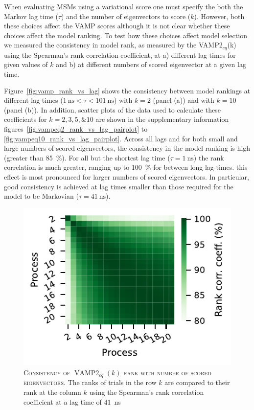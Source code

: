 \documentclass[journal=jacsat,manuscript=article]{achemso}
\begin{document}
When evaluating MSMs using a variational score one must specify the both the Markov lag time ($\tau$) and the number of eigenvectors to score ($k$).  However, both these choices affect the VAMP scores although it is not clear  whether these choices affect the model ranking.  To test how these choices affect model selection we measured the consistency in model rank, as measured by the VAMP2$_{eq}$(k) using the Spearman's rank correlation coefficient, at a) different lag times for given values of $k$ and b) at different numbers of scored eigenvector at a given lag time. 


Figure~\ref{fig:vamp_rank_vs_lag} shows the consistency between model rankings at different lag times ($\SI{1}{\nano\second} < \tau < \SI{101}{\nano\second}$) with $k=2$ (panel (a)) and with $k=10$ (panel (b)). In addition, scatter plots of the data used to calculate these coefficients for $k=2, 3, 5, \& 10$ are shown in the supplementary information figures~\ref{fig:vampeq2_rank_vs_lag_pairplot} to \ref{fig:vampeq10_rank_vs_lag_pairplot}.  Across all lags and for both small and large numbers of scored eigenvectors, the consistency in the model ranking is high (greater than \SI{85}{\percent}). For all but the shortest lag time ($\tau=\SI{1}{\nano\second}$) the rank correlation is much greater, ranging up to \SI{100}{\percent} for between long lag-times.  this effect is most pronounced for larger numbers of scored eigenvectors. In particular, good consistency is achieved at lag times smaller than those required for the model to be Markovian ($\tau=\SI{41}{\nano\second}$).


\begin{figure}
    \centering
    \includegraphics{figures/vampeq_rank_vs_proc.pdf}
    \caption{\textsc{Consistency of $\operatorname{VAMP2}_{eq}(k)$ rank with number of scored eigenvectors}. The ranks of trials in the row $k$ are compared to their rank at the column $k$ using the Spearman's rank correlation coefficient at a lag time of \SI{41}{\nano\second}}
    \label{fig:vampeq_rank_vs_n_procs}
\end{figure}
\end{document}
